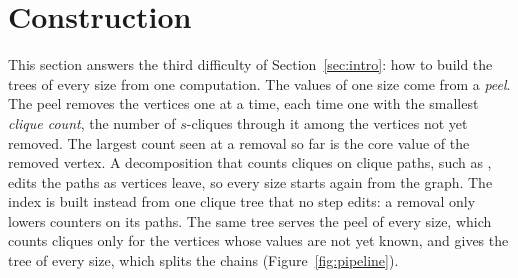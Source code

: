 \section{Construction}\label{sec:construction}

This section answers the third difficulty of Section~\ref{sec:intro}: how to build the trees of every size from one computation.
%
The values of one size come from a \textit{peel}.
%
The peel removes the vertices one at a time, each time one with the smallest \textit{clique count}, the number of $s$-cliques through it among the vertices not yet removed.
%
The largest count seen at a removal so far is the core value of the removed vertex.
%
A decomposition that counts cliques on clique paths, such as \cnd, edits the paths as vertices leave, so every size starts again from the graph.
%
The index is built instead from one clique tree that no step edits: a removal only lowers counters on its paths.
%
The same tree serves the peel of every size, which counts cliques only for the vertices whose values are not yet known, and gives the tree of every size, which splits the chains (Figure~\ref{fig:pipeline}).

